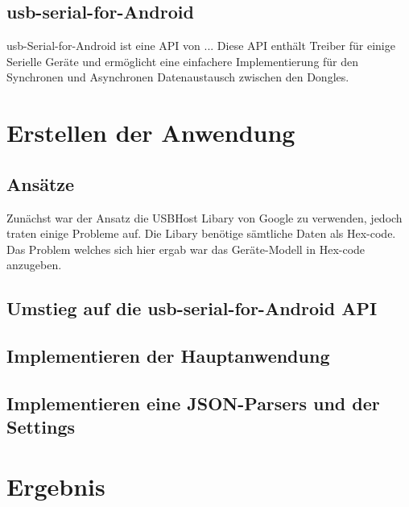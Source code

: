 \documentclass[a4paper, 12.5pt]{scrartcl}
\begin{document}
\subsection{usb-serial-for-Android}

usb-Serial-for-Android ist eine API von ...
Diese API enthält Treiber für einige Serielle Geräte und ermöglicht eine einfachere Implementierung für den Synchronen und Asynchronen Datenaustausch zwischen den Dongles.

\section{Erstellen der Anwendung}

\subsection{Ansätze}
Zunächst war der Ansatz die USBHost Libary von Google zu verwenden, jedoch traten einige Probleme auf. Die Libary benötige sämtliche Daten als Hex-code. Das Problem welches sich hier ergab war das Geräte-Modell in Hex-code anzugeben.

\subsection{Umstieg auf die usb-serial-for-Android API}



\subsection{Implementieren der Hauptanwendung}

\subsection{Implementieren eine JSON-Parsers und der Settings}

\section{Ergebnis}
\end{document}
